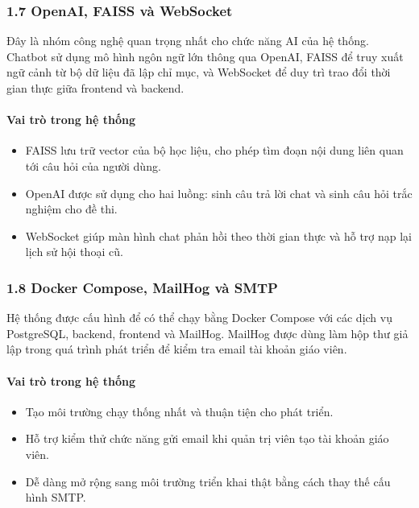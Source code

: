 \documentclass[12pt,a4paper]{article}
\begin{document}
	\subsubsection*{1.7 OpenAI, FAISS và WebSocket}
	Đây là nhóm công nghệ quan trọng nhất cho chức năng AI của hệ thống. Chatbot sử dụng mô hình ngôn ngữ lớn thông qua OpenAI, FAISS để truy xuất ngữ cảnh từ bộ dữ liệu đã lập chỉ mục, và WebSocket để duy trì trao đổi thời gian thực giữa frontend và backend.
	
	\paragraph{Vai trò trong hệ thống}
	\begin{itemize}
		\item FAISS lưu trữ vector của bộ học liệu, cho phép tìm đoạn nội dung liên quan tới câu hỏi của người dùng.
		\item OpenAI được sử dụng cho hai luồng: sinh câu trả lời chat và sinh câu hỏi trắc nghiệm cho đề thi.
		\item WebSocket giúp màn hình chat phản hồi theo thời gian thực và hỗ trợ nạp lại lịch sử hội thoại cũ.
	\end{itemize}
	
	\subsubsection*{1.8 Docker Compose, MailHog và SMTP}
	Hệ thống được cấu hình để có thể chạy bằng Docker Compose với các dịch vụ PostgreSQL, backend, frontend và MailHog. MailHog được dùng làm hộp thư giả lập trong quá trình phát triển để kiểm tra email tài khoản giáo viên.
	
	\paragraph{Vai trò trong hệ thống}
	\begin{itemize}
		\item Tạo môi trường chạy thống nhất và thuận tiện cho phát triển.
		\item Hỗ trợ kiểm thử chức năng gửi email khi quản trị viên tạo tài khoản giáo viên.
		\item Dễ dàng mở rộng sang môi trường triển khai thật bằng cách thay thế cấu hình SMTP.
	\end{itemize}
	
\end{document}
